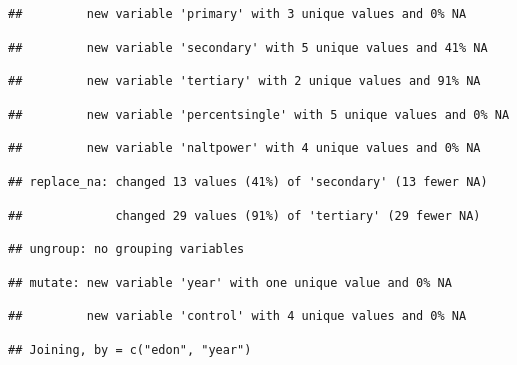 \documentclass[
]{article}
\newenvironment{Shaded}{\begin{snugshade}}{\end{snugshade}}
\newcommand{\KeywordTok}[1]{\textcolor[rgb]{0.13,0.29,0.53}{\textbf{#1}}}
\newcommand{\NormalTok}[1]{#1}
\newcommand{\OperatorTok}[1]{\textcolor[rgb]{0.81,0.36,0.00}{\textbf{#1}}}
\newcommand{\StringTok}[1]{\textcolor[rgb]{0.31,0.60,0.02}{#1}}
\begin{document}
\begin{verbatim}
##         new variable 'primary' with 3 unique values and 0% NA
\end{verbatim}

\begin{verbatim}
##         new variable 'secondary' with 5 unique values and 41% NA
\end{verbatim}

\begin{verbatim}
##         new variable 'tertiary' with 2 unique values and 91% NA
\end{verbatim}

\begin{verbatim}
##         new variable 'percentsingle' with 5 unique values and 0% NA
\end{verbatim}

\begin{verbatim}
##         new variable 'naltpower' with 4 unique values and 0% NA
\end{verbatim}

\begin{verbatim}
## replace_na: changed 13 values (41%) of 'secondary' (13 fewer NA)
\end{verbatim}

\begin{verbatim}
##             changed 29 values (91%) of 'tertiary' (29 fewer NA)
\end{verbatim}

\begin{verbatim}
## ungroup: no grouping variables
\end{verbatim}

\begin{verbatim}
## mutate: new variable 'year' with one unique value and 0% NA
\end{verbatim}

\begin{verbatim}
##         new variable 'control' with 4 unique values and 0% NA
\end{verbatim}

\begin{Shaded}
\end{Shaded}

\begin{verbatim}
## Joining, by = c("edon", "year")
\end{verbatim}
\end{document}
